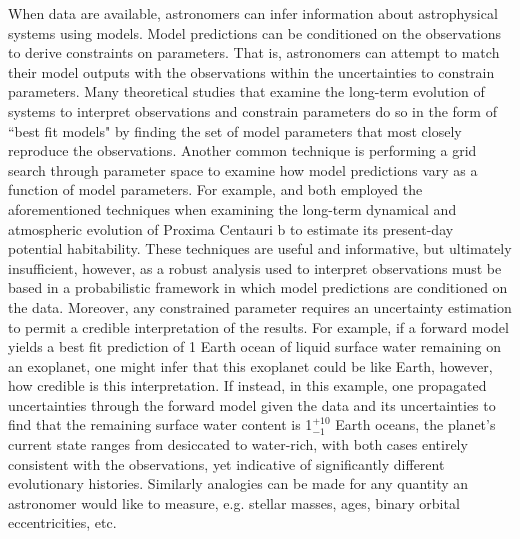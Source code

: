 When data are available, astronomers can infer information about astrophysical systems using models. Model predictions can be conditioned on the observations to derive constraints on parameters. That is, astronomers can attempt to match their model outputs with the observations within the uncertainties to constrain parameters. Many theoretical studies that examine the long-term evolution of systems to interpret observations and constrain parameters do so in the form of ``best fit models" by finding the set of model parameters that most closely reproduce the observations.  Another common technique is performing a grid search through parameter space to examine how model predictions vary as a function of model parameters.  For example, \citet{Ribas2016} and \citet{Barnes2016} both employed the aforementioned techniques when examining the long-term dynamical and atmospheric evolution of Proxima Centauri b to estimate its present-day potential habitability.  These techniques are useful and informative, but ultimately insufficient, however, as a robust analysis used to interpret observations must be based in a probabilistic framework in which model predictions are conditioned on the data. Moreover, any constrained parameter requires an uncertainty estimation to permit a credible interpretation of the results.  For example, if a forward model yields a best fit prediction of 1 Earth ocean of liquid surface water remaining on an exoplanet, one might infer that this exoplanet could be like Earth, however, how credible is this interpretation.  If instead, in this example, one propagated uncertainties through the forward model given the data and its uncertainties to find that the remaining surface water content is 1$^{+10}_{-1}$ Earth oceans, the planet's current state ranges from desiccated to water-rich, with both cases entirely consistent with the observations, yet indicative of significantly different evolutionary histories. Similarly analogies can be made for any quantity an astronomer would like to measure, e.g. stellar masses, ages, binary orbital eccentricities, etc.

